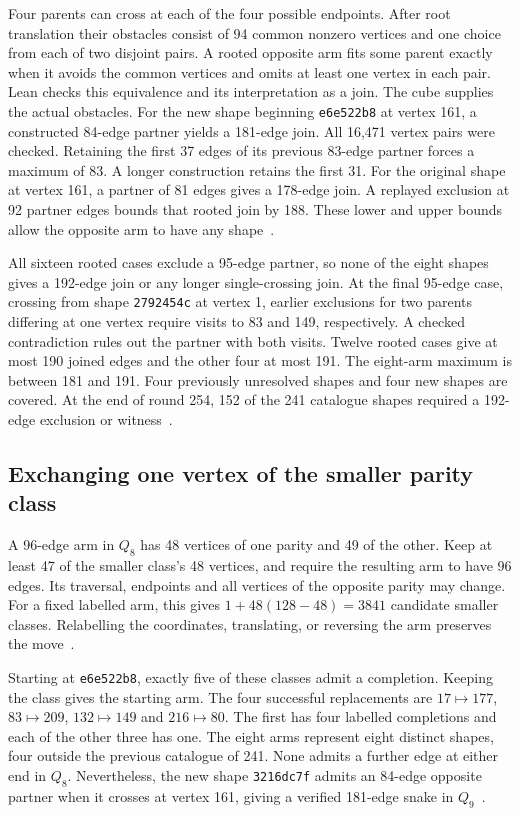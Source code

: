 \documentclass[11pt,a4paper]{article}
\theoremstyle{definition}
\theoremstyle{remark}
\newcommand{\Q}{Q}
\begin{document}
Four parents can cross at each of the four possible endpoints. After
root translation their obstacles consist of 94 common nonzero vertices
and one choice from each of two disjoint pairs. A rooted opposite arm
fits some parent exactly when it avoids the common vertices and omits
at least one vertex in each pair. Lean checks this equivalence and its
interpretation as a join. The cube supplies the actual obstacles.
For the new shape beginning \texttt{e6e522b8} at vertex 161, a
constructed 84-edge partner yields a 181-edge join. All 16,471 vertex
pairs were checked. Retaining the first 37 edges of its previous
83-edge partner forces a maximum of 83. A longer construction retains
the first 31. For the original shape at vertex 161, a partner of
81 edges gives a 178-edge join. A replayed exclusion at 92 partner
edges bounds that rooted join by 188. These lower and upper bounds
allow the opposite arm to have any shape~\cite{distant254}.

All sixteen rooted cases exclude a 95-edge partner, so none of
the eight shapes gives a 192-edge join or any longer single-crossing
join. At the final 95-edge case, crossing from shape
\texttt{2792454c} at vertex 1, earlier exclusions for two parents
differing at one vertex require visits to 83 and 149, respectively.
A checked contradiction rules out the partner with both visits.
Twelve rooted cases give at most 190 joined edges and the other four
at most 191. The eight-arm maximum is between 181 and 191. Four
previously unresolved shapes and four new shapes are covered.
At the end of round 254, 152 of the 241 catalogue shapes required a
192-edge exclusion or witness~\cite{distant254}.

\subsection{Exchanging one vertex of the smaller parity class}\label{sec:parityexchange255}

A 96-edge arm in $\Q_8$ has 48 vertices of one parity and 49 of
the other. Keep at least 47 of the smaller class's 48 vertices,
and require the resulting arm to have 96 edges. Its traversal,
endpoints and all vertices of the opposite parity may change.
For a fixed labelled arm, this gives $1+48(128-48)=3841$
candidate smaller classes. Relabelling the coordinates, translating,
or reversing the arm preserves the move~\cite{exchange255}.

Starting at \texttt{e6e522b8}, exactly five of these classes admit
a completion. Keeping the class gives the starting arm. The four
successful replacements are $17\mapsto177$, $83\mapsto209$,
$132\mapsto149$ and $216\mapsto80$. The first has four labelled
completions and each of the other three has one. The eight arms
represent eight distinct shapes, four outside the previous catalogue
of 241. None admits a further edge at either end in $\Q_8$.
Nevertheless, the new shape \texttt{3216dc7f} admits an 84-edge
opposite partner when it crosses at vertex 161, giving a verified
181-edge snake in $\Q_9$~\cite{exchange255}.
\end{document}
